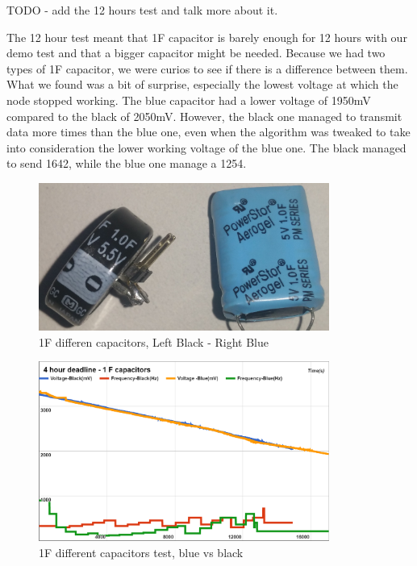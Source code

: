 TODO - add the 12 hours test and talk more about it.

The 12 hour test meant that 1F capacitor is barely enough for 12 hours with our demo test and that
a bigger capacitor might be needed. Because we had two types of 1F capacitor, we were curios to
see if there is a difference between them. What we found was a bit of surprise, especially the
lowest voltage at which the node stopped working. The blue capacitor had a lower voltage of 1950mV
compared to the black of 2050mV. However, the black one managed to transmit data more times than
the blue one, even when the algorithm was tweaked to take into consideration the lower working
voltage of the blue one. The black managed to send 1642, while the blue one manage a 1254.

\begin{figure}[ht] \centering
\includegraphics[width=0.85\textwidth]{img/capacitors.jpg}
\caption{1F differen capacitors, Left Black - Right Blue}
\end{figure}

\begin{figure}[ht] \centering
\includegraphics[width=0.85\textwidth]{img/captest1.png}
\caption{1F different capacitors test, blue vs black}
\end{figure}


